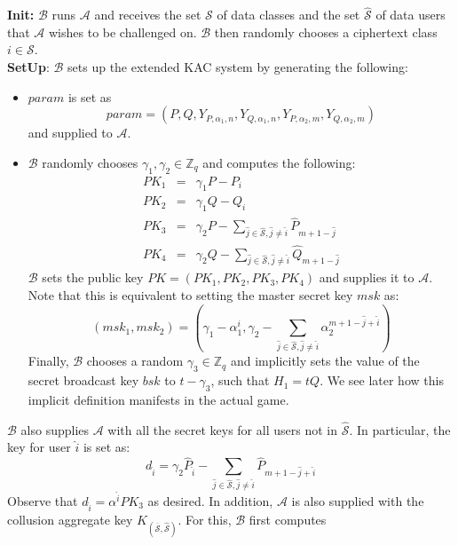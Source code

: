\noindent \textbf{Init:} $\mathcal{B}$ runs $\mathcal{A}$ and receives the set $\mathcal{S}$ of data classes and the set $\hat{\mathcal{S}}$ of data users that $\mathcal{A}$ wishes to be challenged on. $\mathcal{B}$ then randomly chooses a ciphertext class $i\in\mathcal{S}$.\\
 
\noindent \textbf{SetUp}: $\mathcal{B}$ sets up the extended KAC system by generating the following:
\begin{itemize}
  \item $param$ is set as 
  \begin{equation}
    param = (P,Q,Y_{P,\alpha_1,n},Y_{Q,\alpha_1,n},Y_{P,\alpha_2,m},Y_{Q,\alpha_2,m})\nonumber   
  \end{equation}
  \noindent and supplied to $\mathcal{A}$.
  \item $\mathcal{B}$ randomly chooses $\gamma_1,\gamma_2\in\mathbb{Z}_q$ and computes the following:
  \begin{eqnarray}
   PK_1 &=& \gamma_1 P - P_i\nonumber\\
   PK_2 &=& \gamma_1 Q - Q_i\nonumber\\
   PK_3 &=& \gamma_2P-\sum_{\hat{j}\in\hat{\mathcal{S}},\hat{j}\neq \hat{i}}\hat{P}_{m+1-\hat{j}}\nonumber\\
   PK_4 &=& \gamma_2Q-\sum_{\hat{j}\in\hat{\mathcal{S}},\hat{j}\neq \hat{i}}\hat{Q}_{m+1-\hat{j}}\nonumber
  \end{eqnarray}
  \noindent $\mathcal{B}$ sets the public key $PK=(PK_1,PK_2,PK_3,PK_4)$ and supplies it to $\mathcal{A}$. Note that this is equivalent to setting the master secret key $msk$ as:
  \begin{equation}
   (msk_1,msk_2)=\left(\gamma_1-\alpha^i_1,\gamma_2-\sum_{\hat{j}\in\hat{\mathcal{S}},\hat{j}\neq \hat{i}}\alpha^{m+1-\hat{j}+\hat{i}}_2\right)\nonumber
  \end{equation}
  \noindent Finally, $\mathcal{B}$ chooses a random $\gamma_3\in\mathbb{Z}_q$ and implicitly sets the value of the secret broadcast key $bsk$ to $t-\gamma_3$, such that $H_1=tQ$. We see later how this implicit definition manifests in the actual game.
  
\end{itemize}
 
\noindent $\mathcal{B}$ also supplies $\mathcal{A}$ with all the secret keys for all users not in $\hat{\mathcal{S}}$. In particular, the key for user $\hat{i}$ is set as:
\begin{equation}
 d_{\hat{i}} = \gamma_2{\hat{P}_{\hat{i}}}-{\sum_{\hat{j}\in\hat{\mathcal{S}},\hat{j}\neq \hat{i}}\hat{P}_{m+1-\hat{j}+\hat{i}}}\nonumber
\end{equation}
\noindent Observe that $d_{\hat{i}}=\alpha^{\hat{i}}PK_3$ as desired. In addition, $\mathcal{A}$ is also supplied with the collusion aggregate key $K_{\left(\overline{\mathcal{S}},\hat{\mathcal{S}}\right)}$. For this, $\mathcal{B}$ first computes

